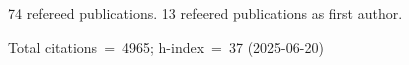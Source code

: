 74 refereed publications. 13 refeered publications as first author.

Total citations~=~4965; h-index~=~37 (2025-06-20)
